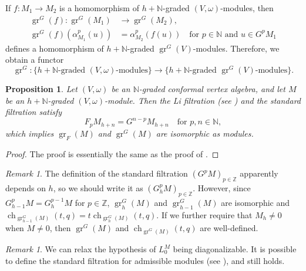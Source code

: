 \documentclass[a4paper, 12pt, reqno]{amsart}
\newtheorem{proposition}[theorem]{Proposition}
\theoremstyle{remark}
\newtheorem{remark}[theorem]{Remark}
\DeclareMathOperator{\gr}{gr}
\DeclareMathOperator{\ch}{ch}
\begin{document}
If $f: M_1 \to M_2$ is a homomorphism of $h + \mathbb{N}$-graded $(V, \omega)$-modules, then
\begin{align*}
  \gr^G(f): \gr^G(M_1) &\to \gr^G(M_2), \\
  \gr^G(f)(\alpha^p_{M_1}(u)) &= \alpha^p_{M_2}(f(u)) \quad \text{for $p \in \mathbb{N}$ and $u \in G^pM_1$}
\end{align*}
defines a homomorphism of $h + \mathbb{N}$-graded $\gr^G(V)$-modules.
Therefore, we obtain a functor
\begin{equation*}
  \gr^G: \{\text{$h + \mathbb{N}$-graded $(V, \omega)$-modules}\} \to \{\text{$h + \mathbb{N}$-graded $\gr^G(V)$-modules}\}.
\end{equation*}

\begin{proposition}
  \label{prp:3}
  Let $(V, \omega)$ be an $\mathbb{N}$-graded conformal vertex algebra, and let $M$ be an $h + \mathbb{N}$-graded $(V, \omega)$-module.
  Then the Li filtration (see \cite{li_abelianizing_2005}) and the standard filtration satisfy
  \begin{equation*}
    F_pM_{h + n} = G^{n - p}M_{h + n} \quad \text{for $p, n \in \mathbb{N}$},
  \end{equation*}
  which implies $\gr_F(M)$ and $\gr^G(M)$ are isomorphic as modules.
\end{proposition}

\begin{proof}
  The proof is essentially the same as the proof of \cite[Proposition 2.6.1]{arakawa_remark_2012}.
\end{proof}

\begin{remark}
  \label{rmk:2}
  The definition of the standard filtration $(G^pM)_{p \in \mathbb{Z}}$ apparently depends on $h$, so we should write it as $(G^p_hM)_{p \in \mathbb{Z}}$.
  However, since $G^p_{h - 1}M = G^{p - 1}_hM$ for $p \in \mathbb{Z}$, $\gr^G_h(M)$ and $\gr^G_{h - 1}(M)$ are isomorphic and $\ch_{\gr^G_{h - 1}(M)}(t, q) = t\ch_{\gr^G_h(M)}(t, q)$.
  If we further require that $M_h \neq 0$ when $M \neq 0$, then $\gr^G(M)$ and $\ch_{\gr^G(M)}(t, q)$ are well-defined.
\end{remark}

\begin{remark}
  \label{rmk:3}
  We can relax the hypothesis of $L_0^M$ being diagonalizable.
  It is possible to define the standard filtration for admissible modules (see \cite[Definition 3.3]{dong_twisted_1998}), and  still holds.
\end{remark}
\end{document}
